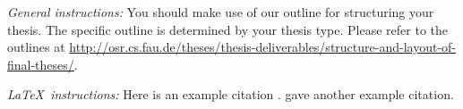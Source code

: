 {\textsl{General instructions:}} 
You should make use of our outline for structuring your
thesis. The specific outline is determined by your thesis type.
Please refer to the outlines at 
\url{http://osr.cs.fau.de/theses/thesis-deliverables/structure-and-layout-of-final-theses/}.

{\textsl{\LaTeX\ instructions:}} Here is an example citation
\autocite{riehle:2011:controlling}.
\textcite{riehle:2007:economic} gave another example citation.

